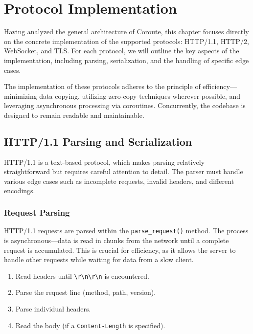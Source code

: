 \section{Protocol Implementation}
\label{sec:protocols}

Having analyzed the general architecture of Coroute, this chapter focuses directly on the concrete implementation of the supported protocols: HTTP/1.1, HTTP/2, WebSocket, and TLS. For each protocol, we will outline the key aspects of the implementation, including parsing, serialization, and the handling of specific edge cases.

The implementation of these protocols adheres to the principle of efficiency---minimizing data copying, utilizing zero-copy techniques wherever possible, and leveraging asynchronous processing via coroutines. Concurrently, the codebase is designed to remain readable and maintainable.

\subsection{HTTP/1.1 Parsing and Serialization}

HTTP/1.1 is a text-based protocol, which makes parsing relatively straightforward but requires careful attention to detail. The parser must handle various edge cases such as incomplete requests, invalid headers, and different encodings.

\subsubsection{Request Parsing}

HTTP/1.1 requests are parsed within the \texttt{parse\_request()} method. The process is asynchronous---data is read in chunks from the network until a complete request is accumulated. This is crucial for efficiency, as it allows the server to handle other requests while waiting for data from a slow client.

\begin{enumerate}
    \item Read headers until \texttt{\textbackslash r\textbackslash n\textbackslash r\textbackslash n} is encountered.
    \item Parse the request line (method, path, version).
    \item Parse individual headers.
    \item Read the body (if a \texttt{Content-Length} is specified).
\end{enumerate}

